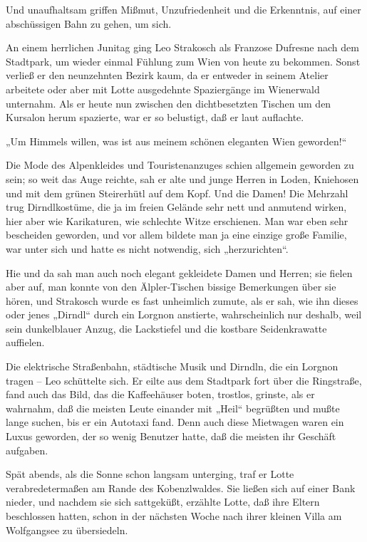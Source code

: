 Und unaufhaltsam griffen Mißmut, Unzufriedenheit und die
Erkenntnis, auf einer abschüssigen Bahn zu gehen, um sich.

\tb{* * *}
An einem herrlichen Junitag ging Leo Strakosch als Franzose
Dufresne nach dem Stadtpark, um wieder einmal Fühlung zum Wien von
heute zu bekommen. Sonst verließ er den neunzehnten Bezirk kaum, da
er entweder in seinem Atelier arbeitete oder aber mit Lotte
ausgedehnte Spaziergänge im Wienerwald unternahm. Als er heute nun
zwischen den dichtbesetzten Tischen um den Kursalon herum
spazierte, war er so belustigt, daß er laut auflachte.

„Um Himmels willen, was ist aus meinem schönen eleganten Wien
geworden!“

Die Mode des Alpenkleides und Touristenanzuges schien allgemein
geworden zu sein; so weit das Auge reichte, sah er alte und junge
Herren in Loden, Kniehosen und mit dem grünen Steirerhütl auf dem
Kopf. Und die  Damen! Die Mehrzahl trug
Dirndlkostüme, die ja im freien Gelände sehr nett und anmutend
wirken, hier aber wie Karikaturen, wie schlechte Witze erschienen.
Man war eben sehr bescheiden geworden, und vor allem bildete man ja
eine einzige große Familie, war unter sich und hatte es nicht
notwendig, sich „herzurichten“.

Hie und da sah man auch noch elegant gekleidete Damen und Herren;
sie fielen aber auf, man konnte von den Älpler-Tischen bissige
Bemerkungen über sie hören, und Strakosch wurde es fast unheimlich
zumute, als er sah, wie ihn dieses oder jenes „Dirndl“ durch ein
Lorgnon anstierte, wahrscheinlich nur deshalb, weil sein
dunkelblauer Anzug, die Lackstiefel und die kostbare Seidenkrawatte
auffielen.

Die elektrische Straßenbahn, städtische Musik und Dirndln, die ein
Lorgnon tragen – Leo schüttelte sich. Er eilte aus dem Stadtpark
fort über die Ringstraße, fand auch das Bild, das die Kaffeehäuser
boten, trostlos, grinste, als er wahrnahm, daß die meisten Leute
einander mit „Heil“ begrüßten und mußte lange suchen, bis er ein
Autotaxi fand. Denn auch diese Mietwagen waren ein Luxus geworden,
der so wenig Benutzer hatte, daß die meisten ihr Geschäft
aufgaben.

Spät abends, als die Sonne schon langsam unterging, traf er Lotte
verabredetermaßen am Rande des Kobenzlwaldes. Sie ließen sich auf
einer Bank nieder, und nachdem sie sich sattgeküßt, erzählte Lotte,
daß ihre Eltern beschlossen hatten, schon in der nächsten Woche
nach ihrer kleinen Villa am Wolfgangsee zu übersiedeln.

